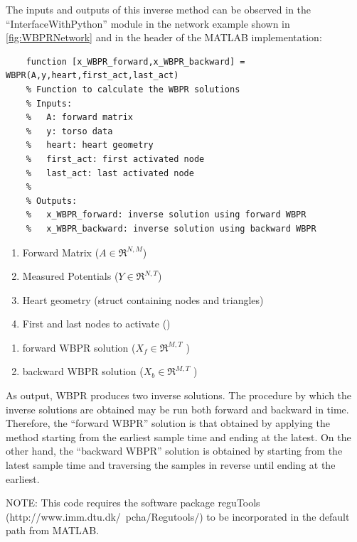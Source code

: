     The inputs and outputs of this inverse method can be observed in the ``InterfaceWithPython'' module in the network example shown in \autoref{fig:WBPRNetwork} and in the header of the MATLAB implementation:
    \begin{verbatim}
    function [x_WBPR_forward,x_WBPR_backward] = WBPR(A,y,heart,first_act,last_act)
    % Function to calculate the WBPR solutions
    % Inputs:
    %   A: forward matrix
    %   y: torso data
    %   heart: heart geometry
    %   first_act: first activated node
    %   last_act: last activated node
    %
    % Outputs:
    %   x_WBPR_forward: inverse solution using forward WBPR
    %   x_WBPR_backward: inverse solution using backward WBPR
    \end{verbatim}

    \begin{enumerate}
        \item Forward Matrix ($A\in\Re^{N,M}$)
        \item Measured Potentials ($Y\in\Re^{N,T}$)
        \item Heart geometry (struct containing nodes and triangles)
        \item First and last nodes to activate ()
    \end{enumerate}
   
    \begin{enumerate}
        \item forward WBPR solution ($X_f\in\Re^{M,T}$ )
        \item backward WBPR solution ($X_b\in\Re^{M,T}$ )
    \end{enumerate}
    As output, WBPR produces two inverse solutions. The procedure by which the inverse solutions are obtained may be run both forward and backward in time. Therefore, the ``forward WBPR'' solution is that obtained by applying the method starting from the earliest sample time and ending at the latest. On the other hand, the ``backward WBPR'' solution is obtained by starting from the latest sample time and traversing the samples in reverse until ending at the earliest.

    NOTE: This code requires the software package reguTools (http://www.imm.dtu.dk/~pcha/Regutools/) to be incorporated in the default path from MATLAB.

